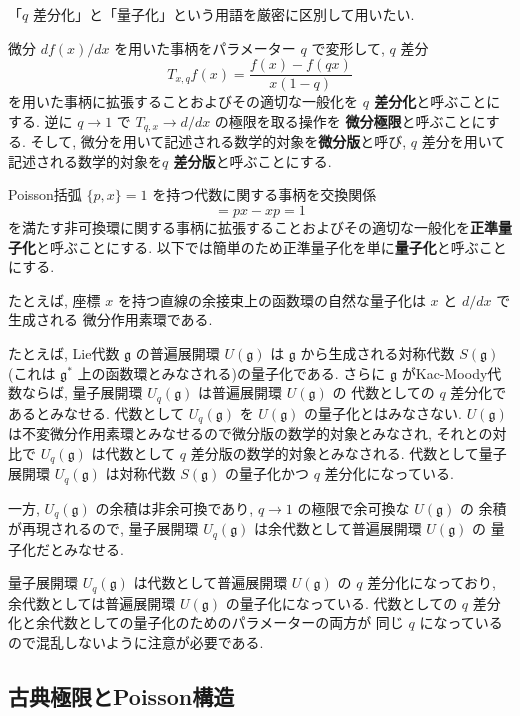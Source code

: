 \documentclass[12pt,twoside,dvipdfm]{msjproc}
\theoremstyle{definition} %
\theoremstyle{definition} %
\theoremstyle{definition} %
\numberwithin{theorem}{section}
\numberwithin{equation}{section}
\numberwithin{figure}{section}
\numberwithin{table}{section}
\newcommand\g{\mathfrak{g}}
\begin{document}
「$q$ 差分化」と「量子化」という用語を厳密に区別して用いたい.

微分 $df(x)/dx$ を用いた事柄をパラメーター $q$ で変形して,  $q$ 差分
\begin{equation*}
 T_{x,q} f(x) = \frac{f(x)-f(qx)}{x(1-q)}
\end{equation*}
を用いた事柄に拡張することおよびその適切な一般化を {\bf $q$ 差分化}と呼ぶことにする.
逆に $q\to 1$ で $T_{q,x}\to d/dx$ の極限を取る操作を {\bf 微分極限}と呼ぶことにする.
そして, 微分を用いて記述される数学的対象を{\bf 微分版}と呼び, 
$q$ 差分を用いて記述される数学的対象を{\bf $q$ 差分版}と呼ぶことにする.



Poisson括弧 $\{p,x\}=1$ を持つ代数に関する事柄を交換関係
\begin{equation*}
 [p,x] = px - xp = 1
\end{equation*} 
を満たす非可換環に関する事柄に拡張することおよびその適切な一般化を{\bf 正準量子化}と呼ぶことにする.
以下では簡単のため正準量子化を単に{\bf 量子化}と呼ぶことにする.

たとえば, 座標 $x$ を持つ直線の余接束上の函数環の自然な量子化は $x$ と $d/dx$ で生成される
微分作用素環である. 

たとえば, Lie代数 $\g$ の普遍展開環 $U(\g)$ は $\g$ から生成される対称代数 $S(\g)$ 
(これは $\g^*$ 上の函数環とみなされる)の量子化である.
さらに $\g$ がKac-Moody代数ならば, 量子展開環 $U_q(\g)$ は普遍展開環 $U(\g)$ の
代数としての $q$ 差分化であるとみなせる.  
代数として $U_q(\g)$ を $U(\g)$ の量子化とはみなさない.
$U(\g)$ は不変微分作用素環とみなせるので微分版の数学的対象とみなされ,  
それとの対比で $U_q(\g)$ は代数として $q$ 差分版の数学的対象とみなされる.
代数として量子展開環 $U_q(\g)$ は対称代数 $S(\g)$ の量子化かつ $q$ 差分化になっている.

一方, $U_q(\g)$ の余積は非余可換であり, $q\to 1$ の極限で余可換な $U(\g)$ の
余積が再現されるので, 量子展開環 $U_q(\g)$ は余代数として普遍展開環 $U(\g)$ の
量子化だとみなせる.

量子展開環 $U_q(\g)$ は代数として普遍展開環 $U(\g)$ の $q$ 差分化になっており, 
余代数としては普遍展開環 $U(\g)$ の量子化になっている. 
代数としての $q$ 差分化と余代数としての量子化のためのパラメーターの両方が
同じ $q$ になっているので混乱しないように注意が必要である.




\subsection{古典極限とPoisson構造}
\end{document}
